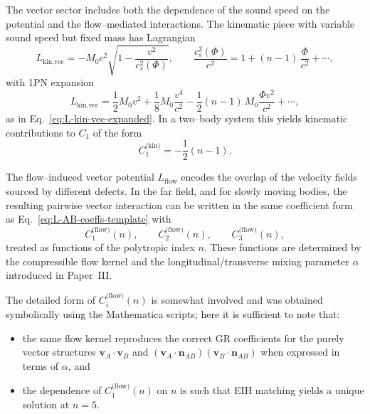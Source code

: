 \documentclass[11pt]{article}
\begin{document}
The vector sector includes both the dependence of the sound speed on the
potential and the flow--mediated interactions.  The kinematic piece with
variable sound speed but fixed mass has Lagrangian
\begin{equation}
  L_{\text{kin,vec}}
  = -M_0 c^2 \sqrt{1 - \frac{v^2}{c_s^2(\Phi)}},
  \qquad
  \frac{c_s^2(\Phi)}{c^2}
  = 1 + (n-1)\,\frac{\Phi}{c^2} + \cdots,
\end{equation}
with 1PN expansion
\begin{equation}
  L_{\text{kin,vec}}
  = \frac{1}{2} M_0 v^2
    + \frac{1}{8} M_0 \frac{v^4}{c^2}
    - \frac{1}{2} (n-1)\,M_0 \frac{\Phi v^2}{c^2}
    + \cdots,
\end{equation}
as in Eq.~\eqref{eq:L-kin-vec-expanded}.  In a two--body system this yields
kinematic contributions to \(C_1\) of the form
\begin{equation}
  C_{1}^{\text{(kin)}}
  = -\frac{1}{2} (n-1).
\end{equation}

The flow--induced vector potential \(L_{\text{flow}}\) encodes the overlap
of the velocity fields sourced by different defects.  In the far field, and
for slowly moving bodies, the resulting pairwise vector interaction can be
written in the same coefficient form as Eq.~\eqref{eq:L-AB-coeffs-template}
with
\begin{equation}
  C_{1}^{\text{(flow)}}(n),
  \qquad
  C_{2}^{\text{(flow)}}(n),
  \qquad
  C_{3}^{\text{(flow)}}(n),
\end{equation}
treated as functions of the polytropic index \(n\).  These functions are
determined by the compressible flow kernel and the longitudinal/transverse
mixing parameter \(\alpha\) introduced in Paper~III.

The detailed form of \(C_{i}^{\text{(flow)}}(n)\) is somewhat involved and
was obtained symbolically using the Mathematica scripts; here it is
sufficient to note that:
\begin{itemize}
  \item the same flow kernel reproduces the correct GR coefficients for the
        purely vector structures \(\mathbf{v}_A \cdot \mathbf{v}_B\) and
        \((\mathbf{v}_A \cdot \mathbf{n}_{AB})
          (\mathbf{v}_B \cdot \mathbf{n}_{AB})\) when expressed in terms
        of \(\alpha\), and
  \item the dependence of \(C_{1}^{\text{(flow)}}(n)\) on \(n\) is such that
        EIH matching yields a unique solution at \(n=5\).
\end{itemize}
\end{document}
